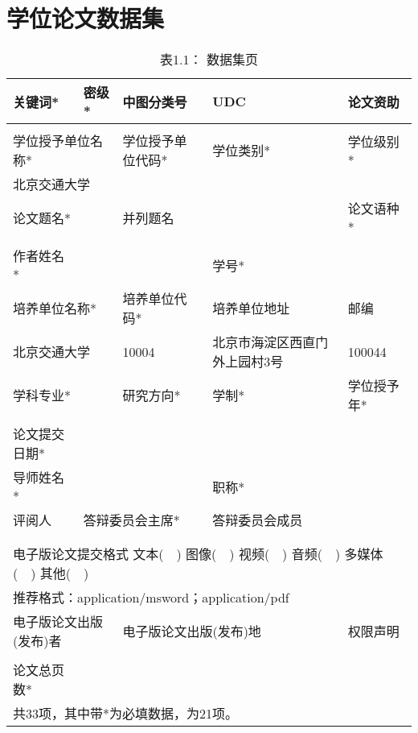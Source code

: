 \chapter*{学位论文数据集}
\begin{table}[H]
\caption*{表1.1： 数据集页}
\renewcommand\arraystretch{0.8} %
\centering
	\begin{tabular}{|p{2.9cm}|p{2.1cm}|p{2.9cm}|p{3.4cm}|p{2.5cm}|}
		\hline	关键词* &密级* & 中图分类号 &	UDC& 论文资助\\
		\hline &&&&\\
		\hline	\multicolumn{2}{|l|}{学位授予单位名称*}&	学位授予单位代码*&	学位类别* & 学位级别*\\
		\hline	\multicolumn{2}{|l|}{北京交通大学}&	& & \\
		\hline	\multicolumn{2}{|l|}{论文题名*} &	\multicolumn{2}{l|}{并列题名}& 论文语种* \\
		\hline	\multicolumn{2}{|l|}{} &	\multicolumn{2}{l|}{}&\\
		\hline	作者姓名*&	\multicolumn{2}{l|}{}&学号* &\\
		\hline	\multicolumn{2}{|l|}{培养单位名称*}&培养单位代码*&培养单位地址&邮编\\
		\hline	\multicolumn{2}{|l|}{北京交通大学}&10004&	北京市海淀区西直门外上园村3号& 100044\\
        \hline	\multicolumn{2}{|l|}{学科专业*}&研究方向*&学制*&学位授予年*\\
        \hline	\multicolumn{2}{|l|}{}&&&\\
        \hline	论文提交日期*&\multicolumn{4}{l|}{}\\
		\hline	导师姓名*&\multicolumn{2}{l|}{}&职称*&\\
        \hline	评阅人&\multicolumn{2}{l|}{答辩委员会主席*}&\multicolumn{2}{l|}{答辩委员会成员}\\
        \hline	&\multicolumn{2}{l|}{}&\multicolumn{2}{l|}{}\\
               &\multicolumn{2}{l|}{}&\multicolumn{2}{l|}{}\\
        \hline \multicolumn{5}{|l|}{电子版论文提交格式  文本(~~)  图像(~~) 视频(~~) 音频(~~) 多媒体(~~) 其他(~~)}\\
        \multicolumn{5}{|l|}{推荐格式：application/msword；application/pdf}\\
        \hline	\multicolumn{2}{|l|}{电子版论文出版(发布)者}&\multicolumn{2}{l|}{电子版论文出版(发布)地}&权限声明\\
		\hline  \multicolumn{2}{|l|}{}&\multicolumn{2}{l|}{}&\\
		\hline  论文总页数*&\multicolumn{4}{l|}{}\\
		\hline  \multicolumn{5}{|l|}{共33项，其中带*为必填数据，为21项。}\\
		\hline
\end{tabular}
\end{table}

